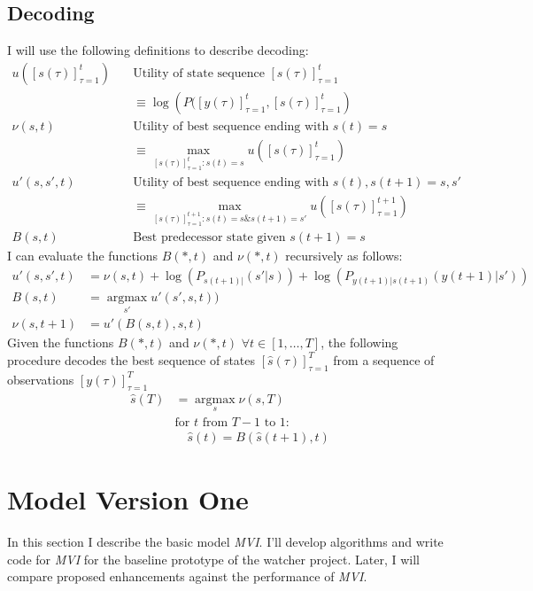 \documentclass[12pt]{article}
\newcommand{\os}[4]{{\left[ #1(#2) \right]}_{#3}^{#4}} %
\newcommand{\ti}[2]{{#1}{(#2)}}                         %
\newcommand{\ts}[4]{\os{#1}{#2}{#2=#3}{#4}} %
\newcommand{\argmax}{\operatorname*{argmax}}
\begin{document}
\subsection{Decoding}
\label{sec:decoding}

I will use the following definitions to describe decoding:
\begin{align*}
  u(\ts{s}{\tau}{1}{t}) & \quad \text{Utility of state sequence }
  \ts{s}{\tau}{1}{t}\\
  & \quad \equiv \log \left( P(\ts{y}{\tau}{1}{t},\ts{s}{\tau}{1}{t} \right)
  \\
  \nu(s,t) & \quad \text{Utility of best sequence ending with }
  \ti{s}{t} = s \\ 
  &  \quad \equiv \max_{\ts{s}{\tau}{1}{t}:\ti{s}{t}=s} u(\ts{s}{\tau}{1}{t}) \\
  u'(s,s',t) & \quad \text{Utility of best sequence ending with }
  \ti{s}{t},\ti{s}{t+1} = s,s' \\
  &  \quad \equiv \max_{\ts{s}{\tau}{1}{t+1}:\ti{s}{t}=s \&\ti{s}{t+1}=s'}
  u(\ts{s}{\tau}{1}{t+1}) \\
  B(s,t) & \quad \text{Best predecessor state given } \ti{s}{t+1}=s   
\end{align*}
I can evaluate the functions $B(*,t)$ and $\nu(*,t)$ recursively as
follows:
\begin{align*}
  u'(s,s',t) &= \nu(s,t) + \log\left( P_{\ti{s}{t+1}|}(s'|s) \right) +
  \log\left( P_{\ti{y}{t+1}|\ti{s}{t+1}}(\ti{y}{t+1}|s') \right) \\
  B(s,t) &= \argmax_{s'} u'(s',s,t)) \\
  \nu(s,t+1) &= u'(B(s,t),s,t)
\end{align*}
Given the functions $B(*,t)$ and $\nu(*,t)$ $\forall
t\in[1,\ldots,T]$, the following procedure decodes the best sequence
of states $ \ts{\hat s}{\tau}{1}{T}$ from a sequence of observations $
\ts{y}{\tau}{1}{T}$
\begin{align*}
  {\ti{{\hat s}}{T}} &= \argmax_s \nu(s,T) \\
  & \text{for } t \text{ from } T-1 \text{ to } 1: \\
  & \quad \ti{\hat s}{t} = B( \ti{\hat s}{t+1},t)
\end{align*}

\section{Model Version One}
\label{sec:model1}

In this section I describe the basic model \emph{MVI}.  I'll develop
algorithms and write code for \emph{MVI} for the baseline prototype of
the watcher project.  Later, I will compare proposed enhancements
against the performance of \emph{MVI}.
\end{document}
